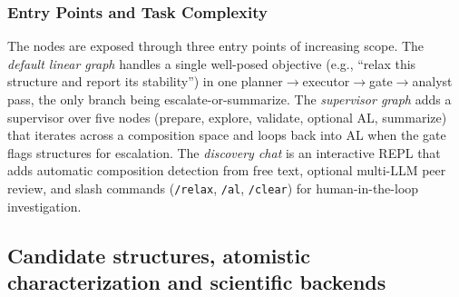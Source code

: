 \documentclass[11pt,a4paper]{article}
\def\ac#1{#1}%
\begin{document}
\subsubsection{Entry Points and Task Complexity}
The nodes are exposed through three entry points of increasing scope. The
\emph{default linear graph} handles a single well-posed objective (e.g., ``relax
this structure and report its stability'') in one
planner$\rightarrow$executor$\rightarrow$gate$\rightarrow$analyst pass, the only
branch being escalate-or-summarize. The \emph{supervisor graph} adds a supervisor
over five nodes (prepare, explore, validate, optional \ac{AL}, summarize) that
iterates across a composition space and loops back into \ac{AL} when the gate
flags structures for escalation. The \emph{discovery chat} is an interactive
\ac{REPL} that adds automatic composition detection from free text, optional
multi-\ac{LLM} peer review, and slash commands (\texttt{/relax}, \texttt{/al},
\texttt{/clear}) for human-in-the-loop investigation.

\subsection{Candidate structures, atomistic characterization and scientific backends}
\end{document}
